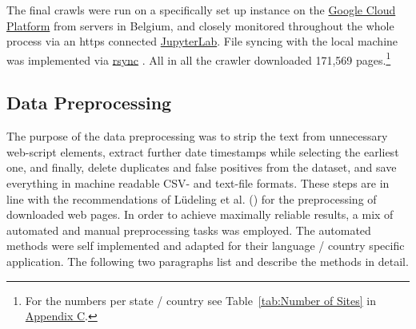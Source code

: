 The final crawls were run on a specifically set up instance on the \href{https://cloud.google.com/}{Google Cloud Platform} from servers in Belgium, and closely monitored throughout the whole process via an https connected \href{https://jupyterlab.readthedocs.io/en/stable/}{JupyterLab}. File syncing with the local machine was implemented via \href{https://linux.die.net/man/1/rsync}{rsync} \parencite{Tridgell2020}. All in all the crawler downloaded 171,569 pages.\footnote{For the numbers per state / country see Table~\ref{tab:Number of Sites} in \hyperref[Appendix C]{Appendix C}.}


\subsection{Data Preprocessing}\label{Data Preprocessing}
The purpose of the data  preprocessing was to strip the text from unnecessary web-script elements, extract further date timestamps while selecting the earliest one, and finally, delete duplicates and false positives from the dataset, and save everything in machine readable CSV- and text-file formats. These steps are in line with the recommendations of Lüdeling et al. (\cite*[p. 19]{Ludeling2015}) for the preprocessing of downloaded web pages. In order to achieve maximally reliable results, a mix of automated and manual preprocessing tasks was employed. The automated methods were self implemented and adapted for their language / country specific application. The following two paragraphs list and describe the methods in detail.\par
